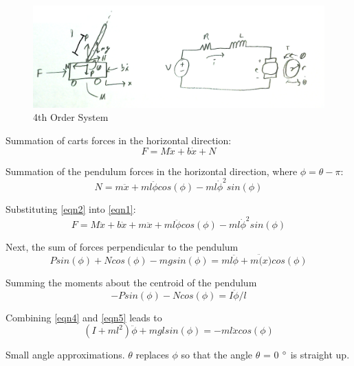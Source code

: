 \documentclass{article}
\begin{document}
\begin{figure}[!htb]
\centering
\includegraphics[width=0.95\linewidth]{System4thOrder}
\caption{4th Order System}
\label{fig:4thOrder}
\end{figure}

Summation of carts forces in the horizontal direction:
\begin{equation} 
\label{eqn1}
F = M\ddot{x}+b\dot{x} + N
\end{equation}

Summation of the pendulum forces in the horizontal direction, where $\phi = \theta - \pi$:
\begin{equation} 
\label{eqn2}
N = m\ddot{x}+m l \ddot{\phi} cos(\phi)-m l \dot{\phi}^2sin(\phi)
\end{equation}

Substituting \ref{eqn2} into \ref{eqn1}:
\begin{equation} 
\label{eqn3}
F = M\ddot{x}+b\dot{x} + m\ddot{x}+m l \ddot{\phi} cos(\phi)-m l \dot{\phi}^2sin(\phi)
\end{equation}

Next, the sum of forces perpendicular to the pendulum
\begin{equation} 
\label{eqn4}
Psin(\phi)+Ncos(\phi)-mgsin(\phi) = m l \ddot{\phi} + m\ddot(x)cos(\phi)
\end{equation}

Summing the moments about the centroid of the pendulum
\begin{equation} 
\label{eqn5}
-P sin(\phi)-N cos(\phi) = I \ddot{\phi}/l
\end{equation}

Combining \ref{eqn4} and \ref{eqn5} leads to 
\begin{equation} 
\label{eqn6}
(I+m l^2)\ddot{\phi} + m g lsin(\phi) = -m l \ddot{x} cos(\phi)
\end{equation}

Small angle approximations. $\theta$ replaces $\phi$ so that the angle $\theta$ = 0 $\degree$ is straight up.
\\
\end{document}
